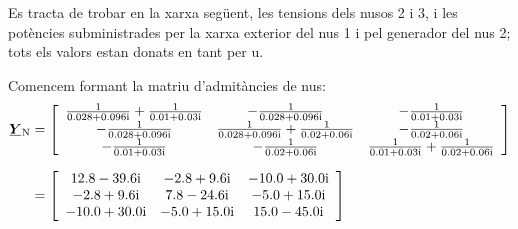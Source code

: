 \begin{exemple}\label{ex:FluxCarrXarxa}
	\addcontentsxms{\FluxCarrXarxa}
    Es tracta de trobar en la xarxa següent, les tensions dels nusos 2
    i 3, i les potències subministrades per la xarxa exterior del nus 1 i pel generador del  nus 2;
    tots els valors estan donats en tant per u.
    \begin{center}
        
    \end{center}

    Comencem formant la matriu d'admitàncies de nus:
    \begin{align*}
    \mcmplx{Y}\ped{N} &= 
    \begin{bmatrix}\begin{array}{ccc} 
    \frac{1}{\complexnum{0,028+j0,096}} + \frac{1}{\complexnum{0,01+j0,03}} & -\frac{1}{\complexnum{0,028+j0,096}}  &  -\frac{1}{\complexnum{0,01+j0,03}}\\
    -\frac{1}{\complexnum{0,028+j0,096}} & \frac{1}{\complexnum{0,028+j0,096}} + \frac{1}{\complexnum{0,02+j0,06}} &  -\frac{1}{\complexnum{0,02+j0,06}}\\
    -\frac{1}{\complexnum{0,01+j0,03}} & -\frac{1}{\complexnum{0,02+j0,06}} &
    \frac{1}{\complexnum{0,01+j0,03}} + \frac{1}{\complexnum{0,02+j0,06}}
    \end{array}\end{bmatrix}  \\[1.5ex]
     &= \begin{bmatrix}\begin{array}{ccc}
    \complexnum{12,8 - j 39,6} & \complexnum{-2,8 + j 9,6} & \complexnum{-10,0 + j 30,0} \\
    \complexnum{-2,8 + j 9,6} & \complexnum{7,8 - j 24,6} & \complexnum{-5,0 + j 15,0} \\
    \complexnum{-10,0 + j 30,0} & \complexnum{-5,0 + j 15,0} & \complexnum{15,0 - j 45,0}
    \end{array}\end{bmatrix}
    \end{align*}


\end{exemple}
